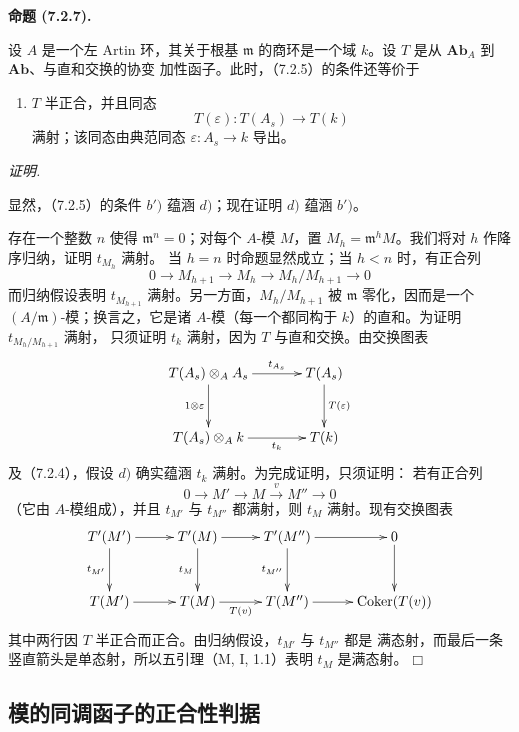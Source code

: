 \documentclass[UTF8,fontset=none,11pt,oneside,openany]{ctexbook}
\providecommand{\square}{\mdlgwhtsquare}
\newenvironment{proposition}[1][]{%
  \par\medskip\noindent\textbf{命题 (#1).}\ %
}{\par}
\newenvironment{proof}{%
  \par\smallskip\noindent\textit{证明.}\ %
}{\hfill$\square$\par}
\newcommand{\oldpage}[2][]{%
  \hypertarget{ega-source-page-#1-#2}{}%
  \marginnote{\scriptsize\textbf{#1}~|~#2}\ignorespaces}
\let\EGAOriginalLabel\label
\renewcommand{\label}[1]{\phantomsection\EGAOriginalLabel{#1}}
\begin{document}
\begin{proposition}[7.2.7]
设 $A$ 是一个左 Artin 环，其关于根基 $\mathfrak m$ 的商环是一个域
$k$。设 $T$ 是从 $\mathbf{Ab}_A$ 到 $\mathbf{Ab}$、与直和交换的协变
加性函子。此时，（7.2.5）的条件还等价于
\begin{enumerate}
  \item[d)] $T$ 半正合，并且同态
    \[
      T(\varepsilon):T(A_s)\longrightarrow T(k)
    \]
    满射；该同态由典范同态 $\varepsilon:A_s\to k$ 导出。
\end{enumerate}
\end{proposition}

\begin{proof}
\oldpage[III]{180}
显然，（7.2.5）的条件 $b')$ 蕴涵 $d)$；现在证明 $d)$ 蕴涵 $b')$。

存在一个整数 $n$ 使得 $\mathfrak m^n=0$；对每个 $A$-模 $M$，置
$M_h=\mathfrak m^hM$。我们将对 $h$ 作降序归纳，证明 $t_{M_h}$ 满射。
当 $h=n$ 时命题显然成立；当 $h<n$ 时，有正合列
\[
  0\longrightarrow M_{h+1}
  \longrightarrow M_h
  \longrightarrow M_h/M_{h+1}
  \longrightarrow 0
\]
而归纳假设表明 $t_{M_{h+1}}$ 满射。另一方面，$M_h/M_{h+1}$ 被
$\mathfrak m$ 零化，因而是一个 $(A/\mathfrak m)$-模；换言之，它是诸
$A$-模（每一个都同构于 $k$）的直和。为证明 $t_{M_h/M_{h+1}}$ 满射，
只须证明 $t_k$ 满射，因为 $T$ 与直和交换。由交换图表
\[
\xymatrix@C=35pt@R=30pt{
  T(A_s)\otimes_A A_s
  \ar[r]^-{t_{A_s}}\ar[d]_{1\otimes\varepsilon}
  &
  T(A_s)\ar[d]^{T(\varepsilon)}
  \\
  T(A_s)\otimes_A k
  \ar[r]_-{t_k}
  &
  T(k)
}
\]
及（7.2.4），假设 $d)$ 确实蕴涵 $t_k$ 满射。为完成证明，只须证明：
若有正合列
\[
  0\longrightarrow M'
  \longrightarrow M
  \xrightarrow{v}M''
  \longrightarrow 0
\]
（它由 $A$-模组成），并且 $t_{M'}$ 与 $t_{M''}$ 都满射，则 $t_M$
满射。现有交换图表
\[
\xymatrix@C=27pt@R=30pt{
  T'(M')\ar[r]\ar[d]_{t_{M'}}
  &
  T'(M)\ar[r]\ar[d]_{t_M}
  &
  T'(M'')\ar[r]\ar[d]_{t_{M''}}
  &
  0\ar[d]
  \\
  T(M')\ar[r]
  &
  T(M)\ar[r]_-{T(v)}
  &
  T(M'')\ar[r]
  &
  \operatorname{Coker}(T(v))
}
\]
其中两行因 $T$ 半正合而正合。由归纳假设，$t_{M'}$ 与 $t_{M''}$ 都是
满态射，而最后一条竖直箭头是单态射，所以五引理（M, I, 1.1）表明
$t_M$ 是满态射。
\end{proof}

\subsection{模的同调函子的正合性判据}
\label{subsection:III.7.3.fr}
\end{document}
